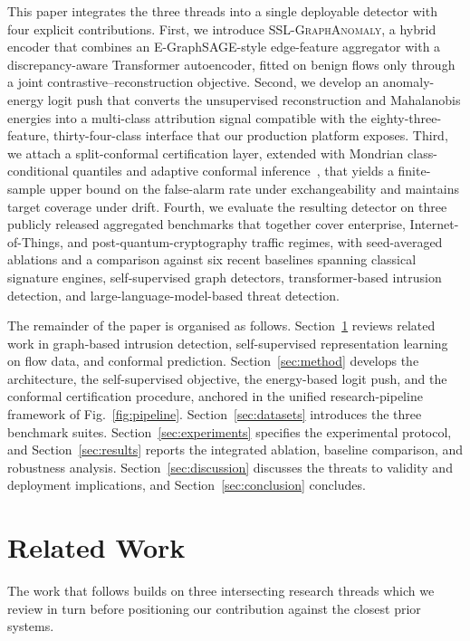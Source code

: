\documentclass[journal,twoside]{IEEEtran}
\begin{document}
This paper integrates the three threads into a single deployable detector
with four explicit contributions. First, we introduce \textsc{SSL-GraphAnomaly},
a hybrid encoder that combines an E-GraphSAGE-style edge-feature aggregator
with a discrepancy-aware Transformer autoencoder, fitted on benign flows
only through a joint contrastive--reconstruction objective. Second, we
develop an anomaly-energy logit push that converts the unsupervised
reconstruction and Mahalanobis energies into a multi-class attribution
signal compatible with the eighty-three-feature, thirty-four-class
interface that our production platform exposes. Third, we attach a
split-conformal certification layer, extended with Mondrian class-conditional
quantiles and adaptive conformal inference~\cite{gibbs2021aci,barber2023nonexch},
that yields a finite-sample upper bound on the false-alarm rate under
exchangeability and maintains target coverage under drift. Fourth, we
evaluate the resulting detector on three publicly released aggregated
benchmarks that together cover enterprise, Internet-of-Things, and
post-quantum-cryptography traffic regimes, with seed-averaged ablations
and a comparison against six recent baselines spanning classical signature
engines, self-supervised graph detectors, transformer-based intrusion
detection, and large-language-model-based threat detection.

The remainder of the paper is organised as follows.
Section~\ref{sec:related} reviews related work in graph-based intrusion
detection, self-supervised representation learning on flow data, and
conformal prediction. Section~\ref{sec:method} develops the architecture,
the self-supervised objective, the energy-based logit push, and the
conformal certification procedure, anchored in the unified
research-pipeline framework of Fig.~\ref{fig:pipeline}.
Section~\ref{sec:datasets} introduces the three benchmark suites.
Section~\ref{sec:experiments} specifies the experimental protocol, and
Section~\ref{sec:results} reports the integrated ablation, baseline
comparison, and robustness analysis. Section~\ref{sec:discussion} discusses
the threats to validity and deployment implications, and
Section~\ref{sec:conclusion} concludes.

\section{Related Work}
\label{sec:related}

The work that follows builds on three intersecting research threads which
we review in turn before positioning our contribution against the closest
prior systems.
\end{document}
